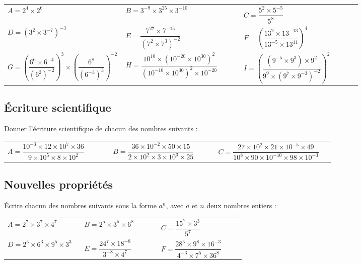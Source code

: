 \documentclass[oneside,12pt]{article}          %
\begin{document}
\renewcommand{\arraystretch}{3}
\begin{tabular}{p{0.33\linewidth} p{0.33\linewidth} p{0.33\linewidth}}
	$A = 2^4 \times 2^6$ &
	$B = 3^{-9} \times 3^{25} \times 3^{-10}$ &
	$C = \dfrac{5^2 \times 5^{-5}}{5^8}$ \\
	$D = \left( 3^2 \times 3^{-7} \right) ^{-3}$ &
	$E = \dfrac{7^{27} \times 7^{-15}}{\left( 7^2 \times 7^3 \right) ^{-2}}$ &
	$F = \left( \dfrac{13^2 \times 13^{-13}}{13^{-5} \times 13^{11}} \right)^4$ \\
	$G = \left( \dfrac{6^6 \times 6^{-4}}{(6^2)^{-2}} \right)^3 \times \left( \dfrac{6^8}{(6^{-3})^3} \right)^{-2}$ &
	$H = \dfrac{10^{10} \times \left( 10^{-20} \times 10^{30} \right) ^2}{\left( 10^{-10} \times 10^{30} \right)^2 \times 10^{-20}}$ &
	$I = \left( \dfrac{\left( 9^{-5} \times 9^3 \right) \times 9^2}{9^9 \times \left( 9^7 \times 9^{-3} \right)^{-2}} \right)^2$ 
\end{tabular}



\subsection{Écriture scientifique}
Donner l'écriture scientifique de chacun des nombres suivants :

\renewcommand{\arraystretch}{2}
\begin{tabular}{p{0.3\linewidth} p{0.3\linewidth} p{0.33\linewidth}}
	$A = \dfrac{10^{-3} \times 12 \times 10^7 \times 36}{9 \times 10^5 \times 8 \times 10^2}$ &
	$B = \dfrac{36 \times 10^{-2} \times 50 \times 15}{2 \times 10^2 \times 3 \times 10^3 \times 25}$ &
	$C = \dfrac{27 \times 10^2 \times 21 \times 10^{-5} \times 49}{10^8 \times 90 \times 10^{-10} \times 98 \times 10^{-3}}$
\end{tabular}



\subsection{Nouvelles propriétés}
Écrire chacun des nombres suivants sous la forme $a^n$, avec $a$ et $n$ deux nombres entiers :

\renewcommand{\arraystretch}{2.5}
\begin{tabular}{p{0.3\linewidth} p{0.3\linewidth} p{0.33\linewidth}}
	$A = 2^7 \times 3^7 \times 4^7$ &
	$B = 2^5 \times 3^5 \times 6^8$ &
	$C = \dfrac{15^7 \times 3^3}{5^7}$ \\
	$D = 2^5 \times 6^3 \times 9^5 \times 3^3$ &
	$E = \dfrac{24^7 \times 18^{-8}}{3^{-8} \times 4^7}$ &
	$F = \dfrac{28^5 \times 9^8 \times 16^{-3}}{4^{-3} \times 7^5 \times 36^8}$
\end{tabular}
\end{document}
